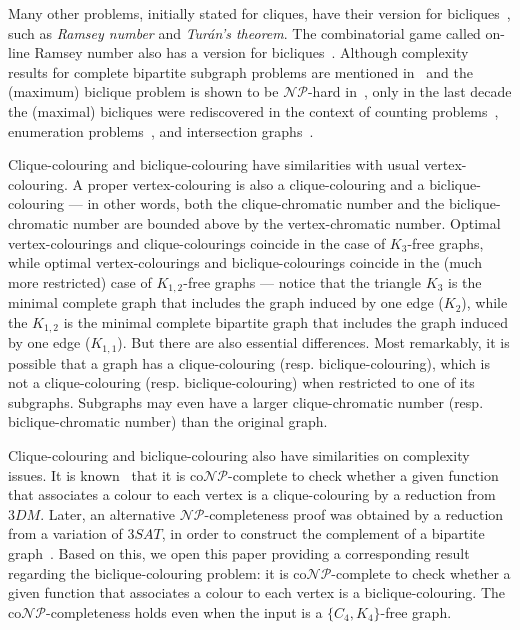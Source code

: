 \documentclass{article}
\begin{document}
Many other problems, initially stated for cliques, have
their version for bicliques~\cite{MR0409253,MR0065617}, such as
\emph{Ramsey number} and \emph{Tur\'an's theorem}.
The combinatorial game called on-line Ramsey
number also has a version for bicliques~\cite{MR2594965}. Although complexity
results for complete bipartite subgraph problems are mentioned
in~\cite{GareyJohnson} and the (maximum) biclique problem is shown to be
$\mathcal{NP}$-hard in~\cite{Yannakakis}, only in the last decade the (maximal)
bicliques were rediscovered in the context of counting
problems~\cite{Gaspers,Prisner}, enumeration problems~\cite{Dias1,Nourine1}, and
intersection graphs~\cite{MarinaJayme}. 

Clique-colouring and biclique-colouring
have similarities with usual vertex-colouring. A proper vertex-colouring is also
a clique-colouring and a biclique-colouring --- in other words, both the
clique-chromatic number and the biclique-chromatic number are bounded above by
the vertex-chromatic number. Optimal vertex-colourings and clique-colourings
coincide in the case of $K_3$-free graphs, while optimal vertex-colourings and
biclique-colourings coincide in the (much more restricted) case of
$K_{1,2}$-free graphs --- notice that the triangle $K_3$ is the minimal
complete graph that includes the graph induced by one edge ($K_2$), while the
$K_{1,2}$ is the minimal complete bipartite graph that includes the graph
induced by one edge ($K_{1,1}$). But there are also essential differences. Most
remarkably, it is possible that a graph has a clique-colouring (resp.
biclique-colouring), which is not a clique-colouring (resp.
biclique-colouring) when restricted to one of its subgraphs.
Subgraphs may even have a larger clique-chromatic number (resp.
biclique-chromatic number) than the original graph. 

Clique-colouring and biclique-colouring also have similarities on complexity issues. 
It is known~\cite{Bacso} that it is co$\mathcal{NP}$-complete
to check whether a given function that associates a colour to each vertex is a clique-colouring
by a reduction from $3DM$. Later, an alternative $\mathcal{NP}$-completeness
proof was obtained by a reduction from a variation of $3SAT$, in order to
construct the complement of a bipartite graph~\cite{Defossez}. Based on this, we open this
paper providing a corresponding result regarding the biclique-colouring problem:
it is co$\mathcal{NP}$-complete to check whether a given function that associates 
a colour to each vertex is a biclique-colouring. The
co$\mathcal{NP}$-completeness holds even when the input is a $\{C_4, K_4\}$-free
graph.
\end{document}

